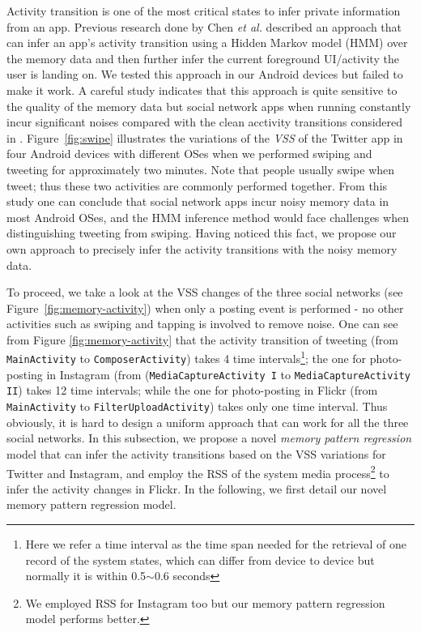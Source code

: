 \documentclass[letterpaper,12pt]{article}
\begin{document}
Activity transition is one of the most critical states to infer private information from an app. Previous research done by Chen \emph{et al.} \cite{chen2014peeking} described an approach that can infer an app's activity transition using a Hidden Markov model (HMM) over the memory data and then further infer the current foreground UI/activity the user is landing on. We tested this approach in our Android devices but failed to make it work. A careful study indicates that this approach is quite sensitive to the quality of the memory data but social network apps when running constantly incur significant noises compared with the clean acctivity transitions considered in \cite{chen2014peeking}. Figure~\ref{fig:swipe} illustrates the variations of the \emph{VSS} of the Twitter app in four Android devices with different OSes when we performed swiping and tweeting for approximately two minutes. Note that people usually swipe when tweet; thus these two activities are commonly performed together. From this study one can conclude that social network apps incur noisy memory data in most Android OSes, and the HMM inference method would face challenges when distinguishing tweeting from swiping. Having noticed this fact, we propose our own approach to precisely infer the activity transitions with the noisy memory data.

To proceed, we take a look at the VSS changes of the three social networks (see Figure~\ref{fig:memory-activity}) when only a posting event is performed - no other activities such as swiping and tapping is involved to remove noise. One can see from Figure \ref{fig:memory-activity} that the activity transition of tweeting (from \texttt{MainActivity} to \texttt{ComposerActivity}) takes 4 time intervals\footnote{Here we refer a time interval as the time span needed for the retrieval of one record of the system states, which can differ from device to device but normally it is within 0.5$\sim$0.6 seconds}; the one for photo-posting in Instagram (from (\texttt{MediaCaptureActivity I} to \texttt{MediaCaptureActivity II}) takes 12 time intervals; while the one for photo-posting in Flickr (from \texttt{MainActivity} to \texttt{FilterUploadActivity}) takes only one time interval. Thus obviously, it is hard to design a uniform approach that can work for all the three social networks. In this subsection, we propose a novel \emph{memory pattern regression} model that can infer the activity transitions based on the VSS variations for Twitter and Instagram, and employ the RSS of the system media process\footnote{We employed RSS for Instagram too but our memory pattern regression model performs better.} to infer the activity changes in Flickr. In the following, we first detail our novel memory pattern regression model. 
\end{document}
